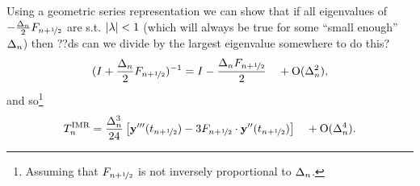 Using a geometric series representation we can show that if all eigenvalues of  $-\frac{\Delta_{n}}{2}F_{n+\nicefrac{1}{2}}$ are s.t. $\lvert \lambda \rvert < 1$\cite{??ds} (which will always be true for some ``small enough'' $\Delta_{n}$) then
??ds can we divide by the largest eigenvalue somewhere to do this?
\begin{equation}
  (I + \frac{\Delta_{n}}{2}F_{n+\nicefrac{1}{2}})^{-1} = I - \frac{\Delta_{n} F_{n+\nicefrac{1}{2}}}{2}  \quad + \text{O}(\Delta_{n}^2),
\end{equation}
and so\footnote{Assuming that $F_{n+\nicefrac{1}{2}}$ is not inversely proportional to $\Delta_{n}$.}
\begin{equation}
  \lte^\imr = \frac{\dtn^3}{24} \left[\yvhf['''] - 3 \dfdyhf \cdot \yvhf[''] \right]
  \quad +\order{\dtn^4}.
  \label{eq:trunc-final}
\end{equation}

